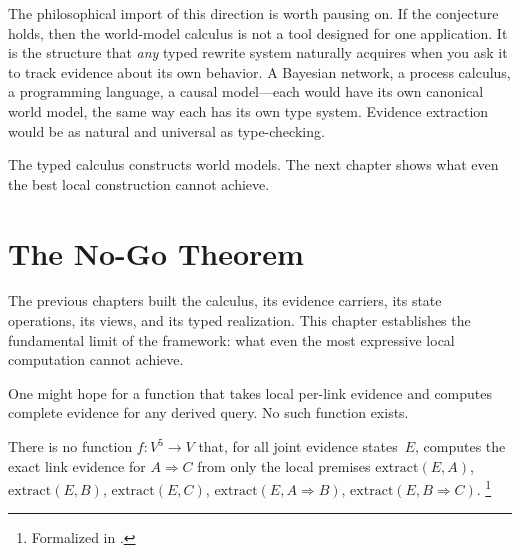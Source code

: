 \documentclass[11pt,openany]{report}
\begin{document}
The philosophical import of this direction is worth pausing on.
If the conjecture holds, then the world-model calculus is not a
tool designed for one application.  It is the structure that
\emph{any} typed rewrite system naturally acquires when you ask it
to track evidence about its own behavior.  A Bayesian network, a
process calculus, a programming language, a causal model---each
would have its own canonical world model, the same way each has its
own type system.  Evidence extraction would be as natural and
universal as type-checking.

The typed calculus constructs world models.  The next chapter shows
what even the best local construction cannot achieve.


\chapter{The No-Go Theorem}
\label{ch:no-go}

The previous chapters built the calculus, its evidence carriers, its
state operations, its views, and its typed realization.  This chapter
establishes the fundamental limit of the framework: what even the most
expressive local computation cannot achieve.

One might hope for a function that takes local per-link evidence and
computes complete evidence for any derived query.  No such function
exists.

\begin{theorem}
\label{thm:no-go}
There is no function $f : V^5 \to V$ that, for all joint evidence
states~$E$, computes the exact link evidence for $A \Rightarrow C$
from only the local premises $\mathrm{extract}(E, A)$,
$\mathrm{extract}(E, B)$, $\mathrm{extract}(E, C)$,
$\mathrm{extract}(E, A \!\Rightarrow\! B)$,
$\mathrm{extract}(E, B \!\Rightarrow\! C)$.%
\footnote{Formalized in
.}
\end{theorem}
\end{document}
